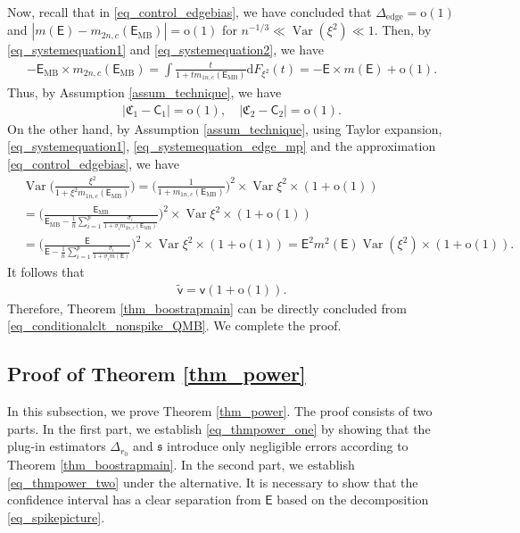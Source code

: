 \documentclass[12pt]{article}
\theoremstyle{plain}
\numberwithin{equation}{section}
\begin{document}
Now, recall that in \eqref{eq_control_edgebias}, we have concluded that $\Delta_{\mathrm{edge}}=\mathrm{o}(1)$ and $|m(\mathsf{E})-m_{2n,c}(\mathsf{E}_{\mathrm{MB}})|=\mathrm{o}(1)$ for $n^{-1/3}\ll\operatorname{Var}(\xi^2)\ll 1$. Then, by \eqref{eq_systemequation1} and \eqref{eq_systemequation2}, we have
\begin{align*}
	-\mathsf{E}_{\mathrm{MB}}\times m_{2n,c}(\mathsf{E}_{\mathrm{MB}})=\int\frac{t}{1+tm_{1n,c}(\mathsf{E}_{\mathrm{MB}})}\mathrm{d}F_{\xi^2}(t)=-\mathsf{E}\times m(\mathsf{E})+\mathrm{o}(1).
\end{align*}
Thus, by Assumption \ref{assum_technique}, we have
\begin{align*}
	|\mathfrak{C}_1-\mathsf{C}_1|=\mathrm{o}(1),\quad |\mathfrak{C}_2-\mathsf{C}_2|=\mathrm{o}(1).
\end{align*}
On the other hand, by Assumption \ref{assum_technique}, using Taylor expansion, \eqref{eq_systemequation1},  \eqref{eq_systemequation_edge_mp} and the approximation \eqref{eq_control_edgebias}, we have
\begin{align*}
	&\operatorname{Var}\Big(\frac{\xi^2}{1+\xi^2m_{1n,c}(\mathsf{E}_{\mathrm{MB}})}\Big)=\Big(\frac{1}{1+m_{1n,c}(\mathsf{E}_{\mathrm{MB}})}\Big)^2\times\operatorname{Var}\xi^2\times(1+\mathrm{o}(1))\\
	&=\Big(\frac{\mathsf{E}_{\mathrm{MB}}}{\mathsf{E}_{\mathrm{MB}}-\frac{1}{n}\sum_{i=1}^p\frac{\sigma_i}{1+\sigma_im_{2n,c}(\mathsf{E}_{\mathrm{MB}})}}\Big)^2\times\operatorname{Var}\xi^2\times(1+\mathrm{o}(1))\\
	&=\Big(\frac{\mathsf{E}}{\mathsf{E}-\frac{1}{n}\sum_{i=1}^p\frac{\sigma_i}{1+\sigma_im(\mathsf{E})}}\Big)^2\times\operatorname{Var}\xi^2\times(1+\mathrm{o}(1))=\mathsf{E}^2m^2(\mathsf{E})\operatorname{Var}(\xi^2)\times(1+\mathrm{o}(1)).
\end{align*}
It follows that 
\begin{align*}
	\tilde{\mathsf{v}}=\mathsf{v}(1+\mathrm{o}(1)).
\end{align*}
Therefore, Theorem \ref{thm_boostrapmain} can be directly concluded from \eqref{eq_conditionalclt_nonspike_QMB}. We complete the proof.


\subsection{Proof of Theorem \ref{thm_power}}\label{appendxi_secthreoem32}

In this subsection, we prove Theorem \ref{thm_power}. The proof consists of two parts. In the first part, we establish \eqref{eq_thmpower_one} by showing that the plug-in estimators $\Delta_{r_0}$ and $\mathfrak{s}$ introduce only negligible errors according to Theorem \ref{thm_boostrapmain}. In the second part, we establish \eqref{eq_thmpower_two} under the alternative. It is necessary to show that the confidence interval has a clear separation from $\mathsf{E}$ based on the decomposition \eqref{eq_spikepicture}.
\end{document}
